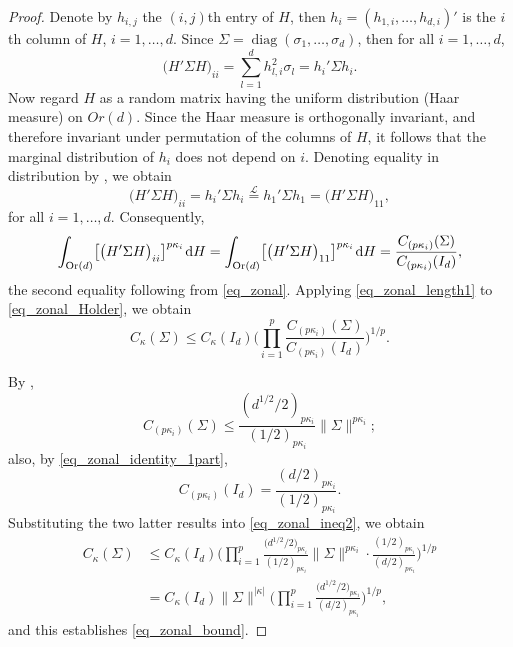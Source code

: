 \documentclass[pdftex]{sigma}
\numberwithin{equation}{section}
\def\dd {\hskip1pt\mathrm{d}}
\def\diag{\mathop{\mathrm{diag}}}
\def\Or{\mathop{\mathrm{Or}}}
\newcommand{\eqdist}{\overset{\mathcal{L}}{=}}
\begin{document}
\begin{proof}
Denote by $h_{i,j}$ the $(i,j)$th entry of $H$, then $h_i = (h_{1,i},\ldots,h_{d,i})'$ is the $i$th column of $H$, $i=1,\ldots,d$. Since $\Sigma = \diag(\sigma_1,\ldots,\sigma_d)$, then for all $i=1,\ldots,d$,
\[
\bigl(H'\Sigma H\bigr)_{ii} = \sum_{l=1}^d h_{l,i}^2 \sigma_l = h_i'\Sigma h_i.
\]
Now regard $H$ as a random matrix having the uniform distribution (Haar measure) on $Or(d)$. Since the Haar measure is orthogonally invariant, and therefore invariant under permutation of the columns of $H$, it follows that the marginal distribution of $h_i$ does not depend on $i$. Denoting equality in distribution by \smash{$\eqdist$}, we obtain
\[
\bigl(H'\Sigma H\bigr)_{ii} = h_i'\Sigma h_i \eqdist h_1'\Sigma h_1 = \bigl(H'\Sigma H\bigr)_{11},
\]
for all $i=1,\ldots,d$. Consequently,
\begin{equation}
\label{eq_zonal_length1}
\int_{\Or(d)} \bigl[\bigl(H'\Sigma H\bigr)_{ii}\bigr]^{p \kappa_i} \dd H = \int_{\Or(d)} \bigl[\bigl(H'\Sigma H\bigr)_{11}\bigr]^{p \kappa_i} \dd H = \frac{C_{(p \kappa_i)}(\Sigma)}{C_{(p \kappa_i)}(I_d)},
\end{equation}
the second equality following from \eqref{eq_zonal}. Applying \eqref{eq_zonal_length1} to \eqref{eq_zonal_Holder}, we obtain
\begin{equation}
\label{eq_zonal_ineq2}
C_\kappa(\Sigma) \le C_\kappa(I_d) \Bigg(\prod_{i=1}^p \frac{C_{(p \kappa_i)}(\Sigma)}{C_{(p \kappa_i)}(I_d)}\Bigg)^{1/p}.
\end{equation}

By \cite[equation~(A.10)]{BagyanRichards},
\[
C_{(p \kappa_i)}(\Sigma) \le \frac{(d^{1/2}/2)_{p \kappa_i}}{(1/2)_{p \kappa_i}} \|\Sigma\|^{p \kappa_i};
\]
also, by \eqref{eq_zonal_identity_1part},
\[
C_{(p \kappa_i)}(I_d) = \frac{(d/2)_{p \kappa_i}}{(1/2)_{p \kappa_i}}.
\]
Substituting the two latter results into \eqref{eq_zonal_ineq2}, we obtain
\begin{align*}
C_\kappa(\Sigma) &\le C_\kappa(I_d) \Bigg(\prod_{i=1}^p \frac{\bigl(d^{1/2}/2\bigr)_{p \kappa_i}}{(1/2)_{p \kappa_i}} \|\Sigma\|^{p \kappa_i} \cdot \frac{(1/2)_{p \kappa_i}}{(d/2)_{p \kappa_i}}\Bigg)^{1/p} \\
&= C_\kappa(I_d) \|\Sigma\|^{|\kappa|} \Bigg(\prod_{i=1}^p \frac{\bigl(d^{1/2}/2\bigr)_{p \kappa_i}}{(d/2)_{p \kappa_i}}\Bigg)^{1/p},
\end{align*}
and this establishes \eqref{eq_zonal_bound}.
\end{proof}
\end{document}
